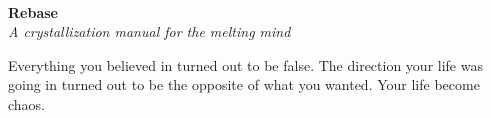 \documentclass[a4paper,hidelinks]{article}
\begin{document}

~
\vspace{55px}

\begin{center}
{\Huge \textbf{
Rebase
}}\\
\vspace{10px}
\textit{
A crystallization manual for the melting mind
}
\end{center}

\vspace{70px}

\begin{center}
\end{center}

\thispagestyle{empty}

\newpage

\vspace*{\fill}
Everything you believed in turned out to be false. The direction your life was going in turned out to be the opposite of what you wanted. Your life become chaos.
\vspace*{\fill}

\restoregeometry
{}

\end{document}
